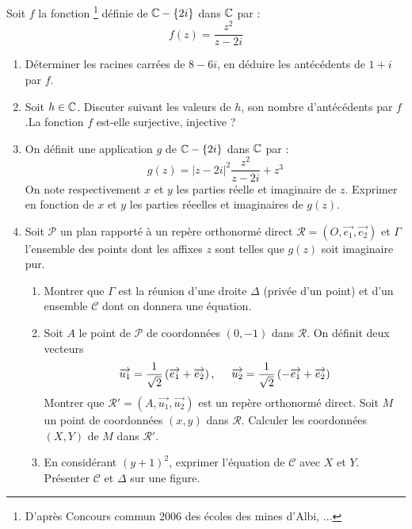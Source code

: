 Soit $f$ la fonction \footnote{D'après Concours commun 2006 des écoles des mines d'Albi, ...} définie de $\mathbb{C} - \{2i\}$ dans $\mathbb{C}$ par :
\begin{displaymath}
 f(z) = \frac{z^2}{z-2i}
\end{displaymath}
\begin{enumerate}
 \item Déterminer les racines carrées de $8-6i$, en déduire les antécédents de $1+i$ par $f$.
 \item Soit $h\in \mathbb{C}$. Discuter suivant les valeurs de $h$, son nombre d'antécédents par $f$.\newline La fonction $f$ est-elle surjective, injective ?
 \item On définit une application $g$ de $\mathbb{C} - \{2i\}$ dans $\mathbb{C}$ par :
\begin{displaymath}
 g(z) = |z-2i|^2 \frac{z^2}{z-2i}+ z^3
\end{displaymath}
On note respectivement $x$ et $y$ les parties réelle et imaginaire de $z$. Exprimer en fonction de $x$ et $y$ les parties réeelles et imaginaires de $g(z)$.
 \item Soit $\mathcal P$ un plan rapporté à un repère orthonormé direct $\mathcal{R}=(O,\overrightarrow{e_1},\overrightarrow{e_2})$ et $\Gamma$ l'ensemble des points dont les affixes $z$ sont telles que $g(z)$ soit imaginaire pur.
\begin{enumerate}
  \item Montrer que $\Gamma$ est la réunion d'une droite $\Delta$ (privée d'un point) et d'un ensemble $\mathcal C$ dont on donnera une équation.
  \item Soit $A$ le point de $\mathcal{P}$ de coordonnées $(0,-1)$ dans $\mathcal{R}$. On définit deux vecteurs
\begin{displaymath}
  \overrightarrow{u_1} = \frac{1}{\sqrt{2}}\left( \overrightarrow{e_1} +\overrightarrow{e_2}\right),\hspace{0.5cm}
  \overrightarrow{u_2} = \frac{1}{\sqrt{2}}\left( -\overrightarrow{e_1} +\overrightarrow{e_2}\right)
\end{displaymath}
Montrer que $\mathcal{R}'=\left(A,\overrightarrow{u_1}, \overrightarrow{u_2}\right)$ est un repère orthonormé direct. Soit $M$ un point de coordonnées $(x,y)$ dans $\mathcal{R}$. Calculer les coordonnées $(X,Y)$ de $M$ dans $\mathcal{R}'$. 
  \item En considérant $(y+1)^2$, exprimer l'équation de $\mathcal{C}$ avec $X$ et $Y$. Présenter $\mathcal{C}$ et $\Delta$ sur une figure. 
\end{enumerate}
\end{enumerate}


